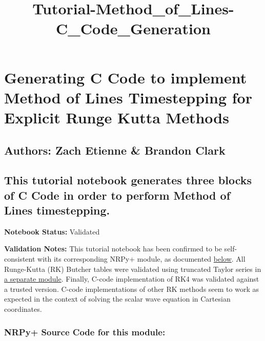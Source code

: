 \documentclass[landscape,letterpaper,10pt,english]{article}
\title{Tutorial-Method\_of\_Lines-C\_Code\_Generation}
\begin{document}
    
    \maketitle
    
    

    
    \hypertarget{generating-c-code-to-implement-method-of-lines-timestepping-for-explicit-runge-kutta-methods}{%
\section{Generating C Code to implement Method of Lines Timestepping for
Explicit Runge Kutta
Methods}\label{generating-c-code-to-implement-method-of-lines-timestepping-for-explicit-runge-kutta-methods}}

\hypertarget{authors-zach-etienne-brandon-clark}{%
\subsection{Authors: Zach Etienne \& Brandon
Clark}\label{authors-zach-etienne-brandon-clark}}

\hypertarget{this-tutorial-notebook-generates-three-blocks-of-c-code-in-order-to-perform-method-of-lines-timestepping.}{%
\subsection{This tutorial notebook generates three blocks of C Code in
order to perform Method of Lines
timestepping.}\label{this-tutorial-notebook-generates-three-blocks-of-c-code-in-order-to-perform-method-of-lines-timestepping.}}

\textbf{Notebook Status:} Validated

\textbf{Validation Notes:} This tutorial notebook has been confirmed to
be self-consistent with its corresponding NRPy+ module, as documented
\hyperref[code_validation]{below}. All Runge-Kutta (RK) Butcher tables
were validated using truncated Taylor series in
\href{Tutorial-RK_Butcher_Table_Validation.ipynb}{a separate module}.
Finally, C-code implementation of RK4 was validated against a trusted
version. C-code implementations of other RK methods seem to work as
expected in the context of solving the scalar wave equation in Cartesian
coordinates.

\hypertarget{nrpy-source-code-for-this-module}{%
\subsubsection{NRPy+ Source Code for this
module:}\label{nrpy-source-code-for-this-module}}
\end{document}
